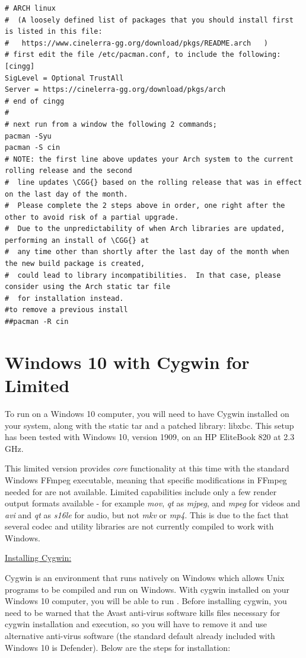 \begin{lstlisting}[numbers=none]
# ARCH linux
#  (A loosely defined list of packages that you should install first is listed in this file:
#   https://www.cinelerra-gg.org/download/pkgs/README.arch   )
# first edit the file /etc/pacman.conf, to include the following:
[cingg]
SigLevel = Optional TrustAll
Server = https://cinelerra-gg.org/download/pkgs/arch
# end of cingg
#
# next run from a window the following 2 commands;
pacman -Syu
pacman -S cin
# NOTE: the first line above updates your Arch system to the current rolling release and the second
#  line updates \CGG{} based on the rolling release that was in effect on the last day of the month.
#  Please complete the 2 steps above in order, one right after the other to avoid risk of a partial upgrade.
#  Due to the unpredictability of when Arch libraries are updated, performing an install of \CGG{} at
#  any time other than shortly after the last day of the month when the new build package is created,
#  could lead to library incompatibilities.  In that case, please consider using the Arch static tar file
#  for installation instead.
#to remove a previous install
##pacman -R cin
\end{lstlisting}

\section{Windows 10 with Cygwin for \CGG{} Limited}%
\label{sec:ms_windows10}

To run \CGG{} on a Windows 10 computer, you will need to have Cygwin installed on your system, 
along with the  \CGG{} static tar and a patched library: libxbc.  This setup has been tested 
with Windows 10, version 1909, on an HP EliteBook 820 at 2.3 GHz.

This limited version provides \textit{core} functionality at this time with the standard Windows FFmpeg
executable, meaning that specific modifications in FFmpeg needed for \CGG{} are not available. 
Limited capabilities include only a few render output formats available - for example \textit{mov}, \textit{qt} 
as \textit{mjpeg}, and \textit{mpeg} for videos and \textit{avi} and \textit{qt} as \textit{s16le} 
for audio, but not \textit{mkv} or \textit{mp4}.  
This is due to the fact that several codec and utility libraries are not currently compiled to 
work with Windows.

\underline{Installing Cygwin:}

Cygwin is an environment that runs natively on Windows which allows Unix programs to be compiled 
and run on Windows.  With cygwin installed on your Windows 10 computer, you will be able to run 
\CGG{}.  Before installing cygwin, you need to be warned that the Avast anti-virus software 
kills files necessary for cygwin installation and execution, so you will have to remove it and 
use alternative anti-virus software (the standard default already included with Windows 10 
is Defender). Below are the steps for installation:


